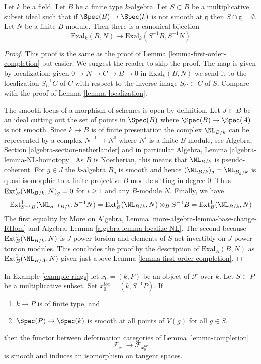 \begin{lemma}
\label{lemma-first-order-localization}
Let $k$ be a field. Let $B$ be a finite type $k$-algebra.
Let $S \subset B$ be a multiplicative subset ideal such that
if $\Spec(B) \to \Spec(k)$ is not smooth at $\mathfrak q$
then $S \cap \mathfrak q = \emptyset$.
Let $N$ be a finite $B$-module.
Then there is a canonical bijection
$$
\text{Exal}_k(B, N) \to \text{Exal}_k(S^{-1}B, S^{-1}N)
$$
\end{lemma}

\begin{proof}
This proof is the same as the proof of
Lemma \ref{lemma-first-order-completion} but easier. We suggest the
reader to skip the proof.
The map is given by localization: given $0 \to N \to C \to B \to 0$
in $\text{Exal}_k(B, N)$ we send it to the localization $S_C^{-1}C$
of $C$ with respect to the inverse image $S_C \subset C$ of $S$.
Compare with the proof of Lemma \ref{lemma-localization}.

\medskip\noindent
The smooth locus of a morphism of schemes is open by definition.
Let $J \subset B$ be an ideal cutting out the set of points
in $\Spec(B)$ where $\Spec(B) \to \Spec(A)$ is not smooth.
Since $k \to B$ is of finite presentation the complex
$\NL_{B/k}$ can be represented by a complex
$N^{-1} \to N^0$ where $N^i$ is a finite $B$-module, see
Algebra, Section \ref{algebra-section-netherlander} and
in particular
Algebra, Lemma \ref{algebra-lemma-NL-homotopy}.
As $B$ is Noetherian, this means that $\NL_{B/k}$
is pseudo-coherent. For $g \in J$ the $k$-algebra $B_g$
is smooth and hence $(\NL_{B/k})_g = \NL_{B_g/k}$
is quasi-isomorphic to a finite projective $B$-module sitting in degree $0$.
Thus $\text{Ext}^i_B(\NL_{B/k}, N)_g = 0$ for $i \geq 1$
and any $B$-module $N$. Finally, we have
$$
\text{Ext}^1_{S^{-1}B}(\NL_{S^{-1}B/k}, S^{-1}N) =
\text{Ext}^1_B(\NL_{B/k}, N) \otimes_B S^{-1}B =
\text{Ext}^1_B(\NL_{B/k}, N)
$$
The first equality by
More on Algebra, Lemma \ref{more-algebra-lemma-base-change-RHom}
and Algebra, Lemma \ref{algebra-lemma-localize-NL}.
The second because $\text{Ext}^1_B(\NL_{B/k}, N)$ is $J$-power
torsion and elements of $S$ act invertibly on $J$-power torsion modules.
This concludes the proof by the description of $\text{Exal}_A(B, N)$
as $\text{Ext}^1_B(\NL_{B/A}, N)$ given just above
Lemma \ref{lemma-first-order-completion}.
\end{proof}

\begin{lemma}
\label{lemma-smooth-localization}
In Example \ref{example-rings} let $x_0 = (k, P)$ be an object
of $\mathcal{F}$ over $k$. Let $S \subset P$ be a multiplicative subset.
Set $x_0^{loc} = (k, S^{-1}P)$. If
\begin{enumerate}
\item $k \to P$ is of finite type, and
\item $\Spec(P) \to \Spec(k)$ is smooth at all points of
$V(g)$ for all $g \in S$.
\end{enumerate}
then the functor between deformation categories of Lemma \ref{lemma-completion}
$$
\mathcal{F}_{x_0} \longrightarrow \mathcal{F}_{x_0^{loc}}
$$
is smooth and induces an isomorphism on tangent spaces.
\end{lemma}


